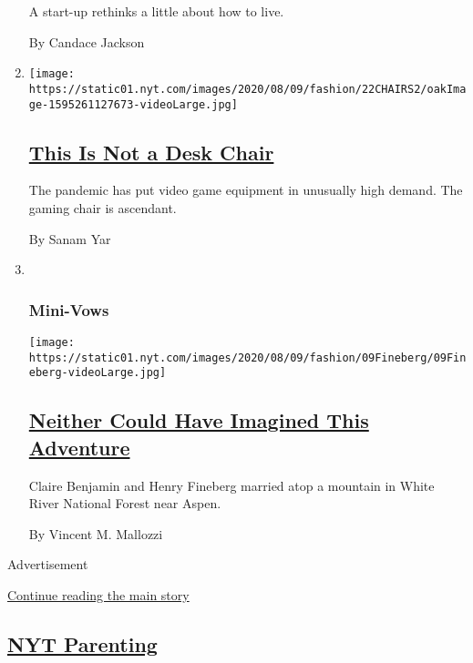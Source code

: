 \begin{enumerate}
  A start-up rethinks a little about how to live.

  By Candace Jackson
\item
  \texttt{[image: https://static01.nyt.com/images/2020/08/09/fashion/22CHAIRS2/oakImage-1595261127673-videoLarge.jpg]}

  \hypertarget{this-is-not-a-desk-chair}{%
  \subsection{\texorpdfstring{\href{/2020/08/07/style/gamer-chair-market-herman-miller.html}{This
  Is Not a Desk
  Chair}}{This Is Not a Desk Chair}}\label{this-is-not-a-desk-chair}}

  The pandemic has put video game equipment in unusually high demand.
  The gaming chair is ascendant.

  By Sanam Yar
\item ~
  \hypertarget{mini-vows}{%
  \subsubsection{Mini-Vows}\label{mini-vows}}

  \texttt{[image: https://static01.nyt.com/images/2020/08/09/fashion/09Fineberg/09Fineberg-videoLarge.jpg]}

  \hypertarget{neither-could-have-imagined-this-adventure}{%
  \subsection{\texorpdfstring{\href{/2020/08/07/fashion/weddings/neither-could-have-imagined-this-adventure.html}{Neither
  Could Have Imagined This
  Adventure}}{Neither Could Have Imagined This Adventure}}\label{neither-could-have-imagined-this-adventure}}

  Claire Benjamin and Henry Fineberg married atop a mountain in White
  River National Forest near Aspen.

  By Vincent M. Mallozzi
\end{enumerate}

Advertisement

\protect\hyperlink{after-mid1}{Continue reading the main story}

\hypertarget{nyt-parenting}{%
\subsection{\texorpdfstring{\href{/spotlight/parenting}{NYT
Parenting}}{NYT Parenting}}\label{nyt-parenting}}

